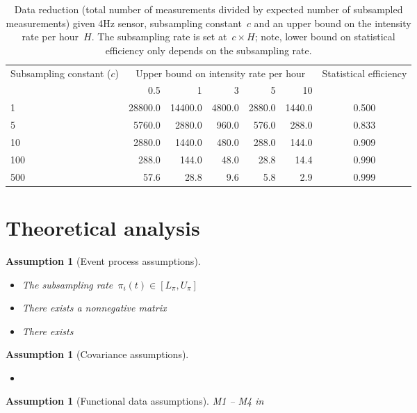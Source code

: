 \documentclass[11pt]{amsart}
\newtheorem{assumption}[thm]{Assumption}
\begin{document}
\begin{table}[!th]
\centering
\begin{tabular}{l r r r r r | c}
\multirow{2}{2.5cm}{Subsampling constant ($c$)} 
  & \multicolumn{5}{c}{Upper bound on intensity rate per
    hour} 
  & \multirow{2}{2cm}{Statistical efficiency}\\ \cline{2-6} 
& 0.5 & 1 & 3 & 5 & 10 \\ \hline
1 & 28800.0 & 14400.0 & 4800.0 & 2880.0 & 1440.0 & 0.500 \\
5 & 5760.0 & 2880.0 & 960.0 & 576.0 & 288.0 & 0.833 \\
10 & 2880.0 & 1440.0 & 480.0 & 288.0 & 144.0 & 0.909 \\
100 & 288.0 & 144.0 & 48.0 & 28.8 & 14.4 & 0.990 \\
500 & 57.6 & 28.8 & 9.6 & 5.8 & 2.9 & 0.999 \\ \hline
\end{tabular}
\caption{Data reduction (total number of measurements divided by
  expected number of subsampled measurements) given 4Hz sensor,
  subsampling constant~$c$ and an upper bound on the intensity
  rate per hour~$H$. The subsampling rate is set at~$c \times H$;
  note, lower bound on statistical efficiency only depends on the
  subsampling rate.}   
\label{tab:compvseff}
\end{table}

\section{Theoretical analysis}


\begin{assumption}[Event process assumptions]
\begin{itemize}
\item The subsampling rate~$\pi_i (t) \in [L_\pi, U_\pi]$ 
\item There exists a nonnegative matrix
\item There exists 
\end{itemize}
\end{assumption}

\begin{assumption}[Covariance assumptions]
\begin{itemize}
\item 
\end{itemize}
\end{assumption}

\begin{assumption}[Functional data assumptions]
M1 -- M4 in 
\end{assumption}
\end{document}
